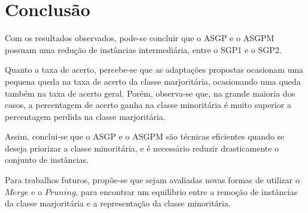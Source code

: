 \chapter{Conclusão}
\label{ch:conclusao}

Com os resultados observados, pode-se concluir que o ASGP e o ASGPM possuam uma redução de instâncias intermediária, entre o SGP1 e o SGP2.

Quanto a taxa de acerto, percebe-se que as adaptações propostas ocasionam uma pequena queda na taxa de acerto da classe marjoritária, ocasionando uma queda também na taxa de acerto geral. Porém, observa-se que, na grande maioria dos casos, a percentagem de acerto ganha na classe minoritária é muito superior a percentagem perdida na classe marjoritária.

Assim, conclui-se que o ASGP e o ASGPM são técnicas eficientes quando se deseja priorizar a classe minoritária, e é necessário reduzir drasticamente o conjunto de instâncias.

Para trabalhos futuros, propõe-se que sejam avaliadas novas formas de utilizar o $Merge$ e o $Pruning$, para encontrar um equilibrio entre a remoção de instâncias da classe marjoritária e a representação da classe minoritária.




